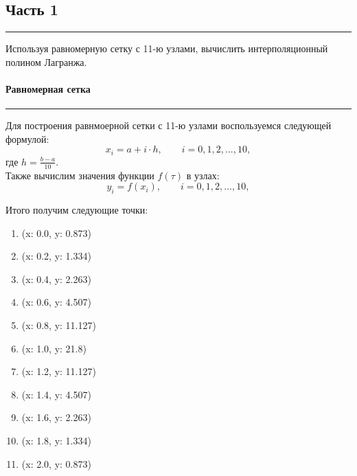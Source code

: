 \documentclass[a4paper, 14pt]{extarticle}
\begin{document}
\subsection*{Часть 1}\vspace{-20pt}\rule{\linewidth}{0.1mm}

Используя равномерную сетку с 11-ю узлами, вычислить интерполяционный полином
Лагранжа.

\paragraph*{Равномерная сетка}\vspace{-20pt}\rule{\linewidth}{0.1mm}

Для построения равнмоерной сетки с 11-ю узлами воспользуемся следующей формулой:
\begin{equation*}
  x_i = a + i \cdot h, \qquad i=0,1,2,...,10,
\end{equation*}
где $h = \frac{b - a}{10}$.\\

Также вычислим значения функции $f(\tau)$ в узлах:
\begin{equation*}
  y_i = f(x_i), \qquad i=0,1,2,...,10,
\end{equation*}

Итого получим следующие точки:
\begin{multicols}{3}
  \begin{enumerate}[itemsep=5pt]
  \item (x: 0.0, y: 0.873)
  \item (x: 0.2, y: 1.334)
  \item (x: 0.4, y: 2.263)
  \item (x: 0.6, y: 4.507)
  \item (x: 0.8, y: 11.127)
  \item (x: 1.0, y: 21.8)
  \item (x: 1.2, y: 11.127)
  \item (x: 1.4, y: 4.507)
  \item (x: 1.6, y: 2.263)
  \item (x: 1.8, y: 1.334)
  \item (x: 2.0, y: 0.873)
  \end{enumerate} 
\end{multicols}

\vfill
\end{document}
